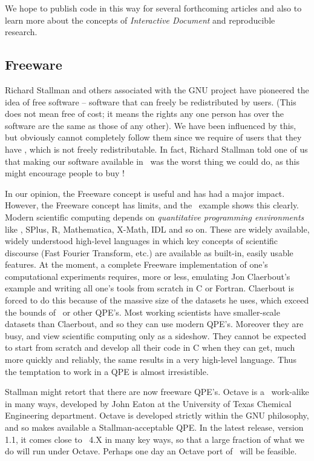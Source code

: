 \documentclass{article}
\begin{document}
We hope to publish code in this way for several forthcoming articles and also to learn more about
the concepts of {\it Interactive Document} and {reproducible research}.

\subsection{Freeware}

Richard Stallman and others associated with the GNU project have pioneered the idea of free
software -- software that can freely be redistributed by users. (This does not mean free of cost;
it means the rights any one person has over the software are the same as those of any other).  We
have been influenced by this, but obviously cannot completely follow them since we require of users
that they have \Matlab, which is not freely redistributable. In fact, Richard Stallman told one of
us that making our software available in \Matlab\ was the worst thing we could do, as this might
encourage people to buy \Matlab!

In our opinion, the Freeware concept is useful and has had a major impact. However, the Freeware
concept has limits, and the \Matlab\ example shows this clearly. Modern scientific computing
depends on {\it quantitative programming environments} like \Matlab, {\sc SPlus}, {\sc R}, {\sc
Mathematica}, {\sc X-Math}, {\sc IDL} and so on. These are widely available, widely understood
high-level languages in which key concepts of scientific discourse (Fast Fourier Transform, etc.)
are available as built-in, easily usable features.  At the moment, a complete Freeware
implementation of one's computational experiments requires, more or less, emulating Jon Claerbout's
example and writing all one's tools from scratch in C or Fortran.  Claerbout is forced to do this
because of the massive size of the datasets he uses, which exceed the bounds of \Matlab\ or other
QPE's. Most working scientists have smaller-scale datasets than Claerbout, and so they can use
modern QPE's. Moreover they are busy, and view scientific computing only as a sideshow.  They
cannot be expected to start from scratch and develop all their code in C when they can get, much
more quickly and reliably, the same results in a very high-level language. Thus the temptation to
work in a QPE is almost irresistible.

Stallman might retort that there are now freeware QPE's.  Octave is a \Matlab\ work-alike in many
ways, developed by John Eaton at the University of Texas Chemical Engineering department.  Octave
is developed strictly within the GNU philosophy, and so makes available a Stallman-acceptable QPE.
In the latest release, version 1.1, it comes close to \Matlab\ 4.X in many key ways, so that a
large fraction of what we do will run under Octave.  Perhaps one day an Octave port of \WaveLab\
will be feasible.
\end{document}
